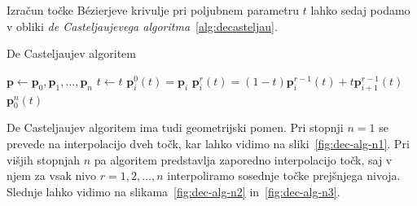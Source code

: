 \documentclass[isrm2, tisk]{fmfdelo}
\newcommand{\p}{\mathbf{p}}
\begin{document}
    \noindent Izračun točke Bézierjeve krivulje pri poljubnem parametru $t$ lahko sedaj podamo v obliki \textit{de Casteljaujevega algoritma}~\ref{alg:decasteljau}.
    \begin{algorithm}[H]
        \caption{De Casteljaujev algoritem}
        \label{alg:decasteljau}
        \begin{algorithmic}
            \State $\p \gets \p_0,\p_1,\dots,\p_n$
            \State $t \gets t$
                \State $\p_i^0(t)=\p_i$
            \EndFor
                    \State $\p_i^r(t)=(1-t)\p_i^{r-1}(t)+t\p_{i+1}^{r-1}(t)$
                \EndFor
            \EndFor
            \State \Return $\p_0^n(t)$
        \end{algorithmic}
    \end{algorithm}
    \noindent De Casteljaujev algoritem ima tudi geometrijski pomen.
    Pri stopnji $n=1$ se prevede na interpolacijo dveh točk, kar lahko vidimo na sliki~\ref{fig:dec-alg-n1}.
    Pri višjih stopnjah $n$ pa algoritem predstavlja zaporedno interpolacijo točk, saj v njem za vsak nivo $r=1,2,\ldots,n$ interpoliramo sosednje točke prejšnjega nivoja.
    Slednje lahko vidimo na slikama~\ref{fig:dec-alg-n2} in~\ref{fig:dec-alg-n3}.
\end{document}
